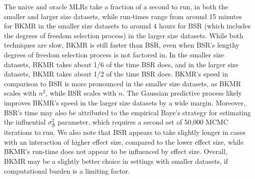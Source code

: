 \documentclass[12pt, twoside]{amherstthesis}
\begin{document}
The naive and oracle MLRs take a fraction of a second to run, in both the smaller and larger size datasets, while run-times range from around 15 minutes for BKMR in the smaller size datasets to around 4 hours for BSR (which includes the degrees of freedom selection process) in the larger size datasets. While both techniques are slow, BKMR is still faster than BSR, even when BSR's lengthy degrees of freedom selection process is not factored in. In the smaller size datasets, BKMR takes about 1/6 of the time BSR does, and in the larger size datasets, BKMR takes about 1/2 of the time BSR does. BKMR's speed in comparison to BSR is more pronounced in the smaller size datasets, as BKMR scales with \(n^2\), while BSR scales with \(n\). The Gaussian predictive process likely improves BKMR's speed in the larger size datasets by a wide margin. Moreover, BSR's time may also be attributed to the empirical Baye's strategy for estimating the influential \(\sigma^2_{\boldsymbol\beta}\) parameter, which requires a second set of 50,000 MCMC iterations to run. We also note that BSR appears to take slightly longer in cases with an interaction of higher effect size, compared to the lower effect size, while BKMR's run-time does not appear to be influenced by effect size. Overall, BKMR may be a slightly better choice in settings with smaller datasets, if computational burden is a limiting factor.
\end{document}
